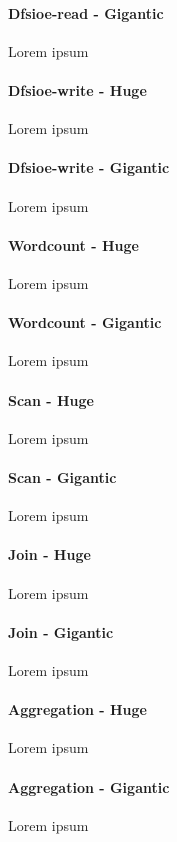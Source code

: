 \documentclass[review]{elsarticle}
\begin{document}
\paragraph{Dfsioe-read - Gigantic} Lorem ipsum

\paragraph{Dfsioe-write - Huge} Lorem ipsum

\paragraph{Dfsioe-write - Gigantic} Lorem ipsum

\paragraph{Wordcount - Huge} Lorem ipsum

\paragraph{Wordcount - Gigantic} Lorem ipsum

\paragraph{Scan - Huge} Lorem ipsum

\paragraph{Scan - Gigantic} Lorem ipsum

\paragraph{Join - Huge} Lorem ipsum

\paragraph{Join - Gigantic} Lorem ipsum

\paragraph{Aggregation - Huge} Lorem ipsum

\paragraph{Aggregation - Gigantic} Lorem ipsum
\end{document}
